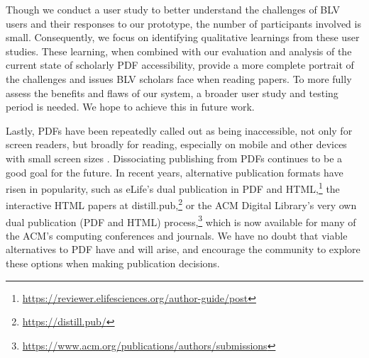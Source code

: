 Though we conduct a user study to better understand the challenges of BLV users and their responses to our prototype, the number of participants involved is small. Consequently, we focus on identifying qualitative learnings from these user studies. These learning, when combined with our evaluation and analysis of the current state of scholarly PDF accessibility, provide a more complete portrait of the challenges and issues BLV scholars face when reading papers. To more fully assess the benefits and flaws of our system, a broader user study and testing period is needed. We hope to achieve this in future work.

Lastly, PDFs have been repeatedly called out as being inaccessible, not only for screen readers, but broadly for reading, especially on mobile and other devices with small screen sizes \citep{NielsenPDFStillUnfit}. Dissociating publishing from PDFs continues to be a good goal for the future. In recent years, alternative publication formats have risen in popularity, such as eLife's dual publication in PDF and HTML,\footnote{\href{https://reviewer.elifesciences.org/author-guide/post}{https://reviewer.elifesciences.org/author-guide/post}} the interactive HTML papers at distill.pub,\footnote{\href{https://distill.pub/}{https://distill.pub/}} or the ACM Digital Library's very own dual publication (PDF and HTML) process,\footnote{\href{https://www.acm.org/publications/authors/submissions}{https://www.acm.org/publications/authors/submissions}} which is now available for many of the ACM's computing conferences and journals. We have no doubt that viable alternatives to PDF have and will arise, and encourage the community to explore these options when making publication decisions.
